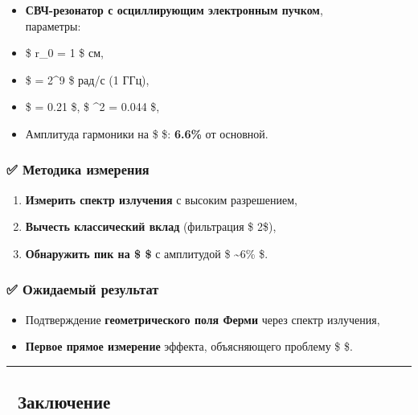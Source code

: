 \documentclass[11pt]{article}
\providecommand{\tightlist}{%
      \setlength{\itemsep}{0pt}\setlength{\parskip}{0pt}}
\begin{document}
\begin{itemize}
\tightlist
\item
  \textbf{СВЧ-резонатор с осциллирующим электронным пучком},\\
  параметры:
\item
  \$ r\_0 = 1 \$ см,
\item
  \$ \omega = 2\pi {}\^{}9 \$ рад/с (1 ГГц),
\item
  \$ \eta = 0.21 \$, \$ \eta\^{}2 = 0.044 \$,
\item
  Амплитуда гармоники на \$ \omega \$: \textbf{6.6\%} от основной.
\end{itemize}

\subsubsection{✅ Методика
измерения}\label{ux43cux435ux442ux43eux434ux438ux43aux430-ux438ux437ux43cux435ux440ux435ux43dux438ux44f}

\begin{enumerate}
\def\labelenumi{\arabic{enumi}.}
\tightlist
\item
  \textbf{Измерить спектр излучения} с высоким разрешением,
\item
  \textbf{Вычесть классический вклад} (фильтрация \$ 2\omega \$),
\item
  \textbf{Обнаружить пик на \$ \omega \$} с амплитудой \$ \sim 6\% \$.
\end{enumerate}

\subsubsection{✅ Ожидаемый
результат}\label{ux43eux436ux438ux434ux430ux435ux43cux44bux439-ux440ux435ux437ux443ux43bux44cux442ux430ux442}

\begin{itemize}
\tightlist
\item
  Подтверждение \textbf{геометрического поля Ферми} через спектр
  излучения,
\item
  \textbf{Первое прямое измерение} эффекта, объясняющего проблему \$
   \$.
\end{itemize}

\begin{center}\rule{0.5\linewidth}{\linethickness}\end{center}

\subsection{📌
Заключение}\label{ux437ux430ux43aux43bux44eux447ux435ux43dux438ux435-3}
\end{document}
